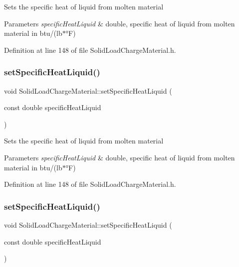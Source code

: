 Sets the specific heat of liquid from molten material 
\begin{DoxyParams}{Parameters}
{\em specific\+Heat\+Liquid} & double, specific heat of liquid from molten material in btu/(lb$\ast$°F) \\
\hline
\end{DoxyParams}


Definition at line 148 of file Solid\+Load\+Charge\+Material.\+h.

\mbox{\label{class_solid_load_charge_material_a91fad347bf52a4f6695c304904091797}} 
\subsubsection{\texorpdfstring{set\+Specific\+Heat\+Liquid()}{setSpecificHeatLiquid()}\hspace{0.1cm}{\footnotesize\ttfamily [2/3]}}
{\footnotesize\ttfamily void Solid\+Load\+Charge\+Material\+::set\+Specific\+Heat\+Liquid (\begin{DoxyParamCaption}\item[{const double}]{specific\+Heat\+Liquid }\end{DoxyParamCaption})\hspace{0.3cm}{\ttfamily [inline]}}

Sets the specific heat of liquid from molten material 
\begin{DoxyParams}{Parameters}
{\em specific\+Heat\+Liquid} & double, specific heat of liquid from molten material in btu/(lb$\ast$°F) \\
\hline
\end{DoxyParams}


Definition at line 148 of file Solid\+Load\+Charge\+Material.\+h.

\mbox{\label{class_solid_load_charge_material_a91fad347bf52a4f6695c304904091797}} 
\subsubsection{\texorpdfstring{set\+Specific\+Heat\+Liquid()}{setSpecificHeatLiquid()}\hspace{0.1cm}{\footnotesize\ttfamily [3/3]}}
{\footnotesize\ttfamily void Solid\+Load\+Charge\+Material\+::set\+Specific\+Heat\+Liquid (\begin{DoxyParamCaption}\item[{const double}]{specific\+Heat\+Liquid }\end{DoxyParamCaption})\hspace{0.3cm}{\ttfamily [inline]}}


